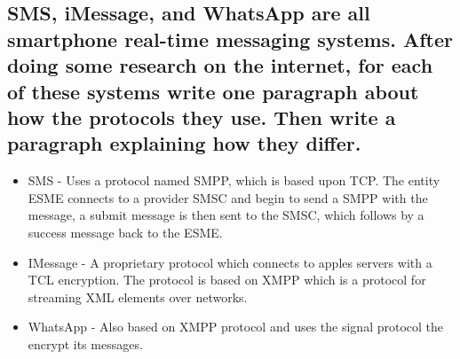 \documentclass[12pt, a4paper]{article}
\begin{document}
		\subsection{SMS, iMessage, and WhatsApp are all smartphone real-time messaging systems. After doing some research on the internet, for each of these systems write one paragraph about how the protocols they use. Then write a paragraph explaining how they differ.}
			\begin{itemize}
				\item SMS - Uses a protocol named SMPP, which is based upon TCP. The entity ESME connects to a provider SMSC and begin to send a SMPP with the message, a submit message is then sent to the SMSC, which follows by a success message back to the ESME.
				\item IMessage - A proprietary protocol which connects to apples servers with a TCL encryption. The protocol is based on XMPP which is a protocol for streaming XML elements over networks.
				\item WhatsApp - Also based on XMPP protocol and uses the signal protocol the encrypt its messages.
			\end{itemize} 
\end{document}
